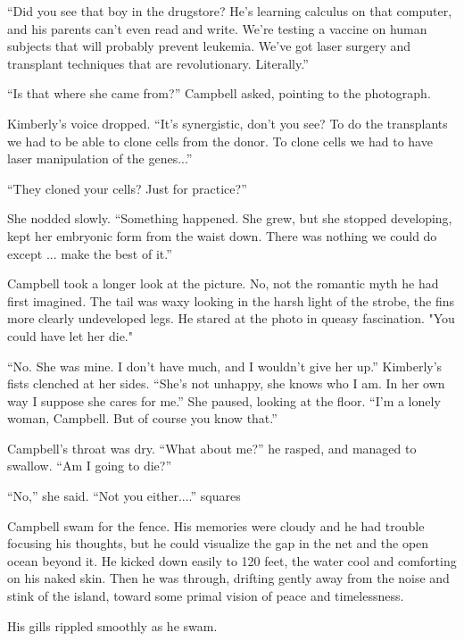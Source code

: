 ``Did you see that boy in the drugstore? He's learning calculus on that computer, and his parents can't even read and write. We're testing a vaccine on human subjects that will probably prevent leukemia. We've got laser surgery and transplant techniques that are revolutionary. Literally.''

``Is that where she came from?'' Campbell asked, pointing to the photograph.

Kimberly's voice dropped. ``It's synergistic, don't you see? To do the transplants we had to be able to clone cells from the donor. To clone cells we had to have laser manipulation of the genes...''

``They cloned your cells? Just for practice?''

She nodded slowly. ``Something happened. She grew, but she stopped developing, kept her embryonic form from the waist down. There was nothing we could do except ... make the best of it.''

Campbell took a longer look at the picture. No, not the romantic myth he had first imagined. The tail was waxy looking in the harsh light of the strobe, the fins more clearly undeveloped legs. He stared at the photo in queasy fascination. "You could have let her die."

``No. She was mine. I don't have much, and I wouldn't give her up.'' Kimberly's fists clenched at her sides. ``She's not unhappy, she knows who I am. In her own way I suppose she cares for me.'' She paused, looking at the floor. ``I'm a lonely woman, Campbell. But of course you know that.''

Campbell's throat was dry. ``What about me?'' he rasped, and managed to swallow. ``Am I going to die?''

``No,'' she said. ``Not you either....''
squares

Campbell swam for the fence. His memories were cloudy and he had trouble focusing his thoughts, but he could visualize the gap in the net and the open ocean beyond it. He kicked down easily to 120 feet, the water cool and comforting on his naked skin. Then he was through, drifting gently away from the noise and stink of the island, toward some primal vision of peace and timelessness.

His gills rippled smoothly as he swam.